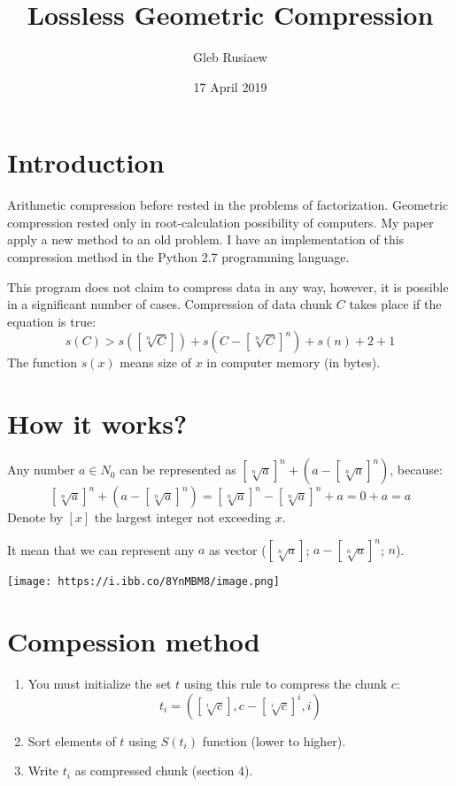 \documentclass[12pt]{article}
\title{Lossless Geometric Compression}
\author{Gleb Rusiaew}
\date{17 April 2019}
\begin{document}
\maketitle
\section{Introduction}

Arithmetic compression before rested in the problems of factorization. Geometric compression rested only in root-calculation possibility of computers. My paper apply a new method to an old problem. I have an implementation of this compression method in the Python 2.7 programming language.

This program does not claim to compress data in any way, however, it is possible in a significant number of cases. Compression of data chunk $C$ takes place if the equation is true:
$$s(C) > s([\sqrt[n]{C}]) + s(C - [\sqrt[n]{C}]^n) + s(n) + 2 + 1$$
The function $s(x)$ means size of $x$ in computer memory (in bytes).

\section{How it works?}

Any number $a \in N_0$ can be represented as $[\sqrt[n]{a}]^n + (a - [\sqrt[n]{a}]^n)$, because:
$$[\sqrt[n]{a}]^n + (a - [\sqrt[n]{a}]^n) = [\sqrt[n]{a}]^n - [\sqrt[n]{a}]^n + a = 0 + a = a$$
Denote by $[x]$ the largest integer not exceeding $x$.

It mean that we can represent any $a$ as vector ($[\sqrt[n]{a}]$; $a - [\sqrt[n]{a}]^n$; $n$). 
\begin {center}
  \texttt{[image: https://i.ibb.co/8YnMBM8/image.png]}\\
\end {center}

\section{Compession method}
\begin{enumerate}
\item You must initialize the set $t$ using this rule to compress the chunk $c$:
$$t_i = ([\sqrt[i]{c}], c - [\sqrt[i]{c}]^i, i)$$
\item Sort elements of $t$ using $S(t_i)$ function (lower to higher).
\item Write $t_i$ as compressed chunk (section 4).
\end{enumerate}
\end{document}
